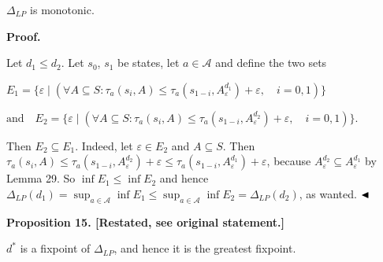 \documentclass[10pt,a4paper]{article}
\begin{document}
 
$\Delta_{LP}$ is monotonic.\par
 
 
 
 


 
\par\medskip\noindent\textbf{Proof.}\par
 
 
Let $d_{1}\leq d_{2}$. Let $s_{0}$, $s_{1}$ be states, let $a\in\mathcal{A}$ and define the two sets\par
  
\par  \quad  $\displaystyle E_{1}$\quad  $\displaystyle=\{\varepsilon\mid(\forall A\subseteq S:\tau_{a}(s_{i},A)\leq\tau_{a}(s_{1-i},A^{d_{1}}_{\varepsilon})+\varepsilon,\quad i=0,1)\}$\quad  \quad  
 
\par  \quad  $\displaystyle\mbox{and}\quad E_{2}$\quad  $\displaystyle=\{\varepsilon\mid(\forall A\subseteq S:\tau_{a}(s_{i},A)\leq\tau_{a}(s_{1-i},A^{d_{2}}_{\varepsilon})+\varepsilon,\quad i=0,1)\}.$\quad  \quad  
  
Then $E_{2}\subseteq E_{1}$. Indeed, let $\varepsilon\in E_{2}$ and $A\subseteq S$. Then $\tau_{a}(s_{i},A)\leq\tau_{a}(s_{1-i},A^{d_{2}}_{\varepsilon})+\varepsilon\leq\tau_{a}(s_{1-i},A^{d_{1}}_{\varepsilon})+\varepsilon$, because $A^{d_{2}}_{\varepsilon}\subseteq A^{d_{1}}_{\varepsilon}$ by Lemma 29. So $\inf E_{1}\leq\inf E_{2}$ and hence $\Delta_{LP}(d_{1})=\sup_{a\in\mathcal{A}}\inf E_{1}\leq\sup_{a\in\mathcal{A}}\inf E_{2}=\Delta_{LP}(d_{2})$, as wanted. $\hfill\blacktriangleleft$\par
 
 
 
 
\par\medskip\noindent\textbf{Proposition 15. [Restated, see original statement.]}\par
 
 
$d^{*}$ is a fixpoint of $\Delta_{LP}$, and hence it is the greatest fixpoint.\par
 
\end{document}
